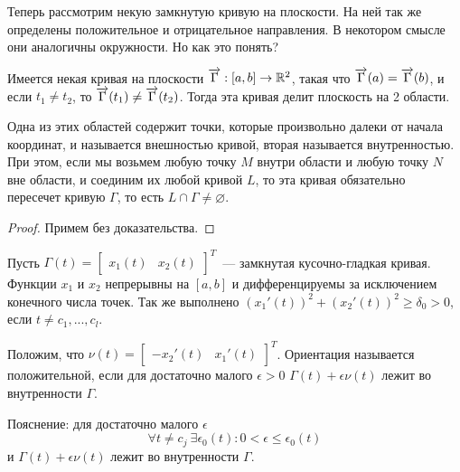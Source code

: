 \documentclass[main]{subfiles}
\begin{document}
Теперь рассмотрим некую замкнутую кривую на плоскости.
На ней так же определены положительное и отрицательное направления.
В некотором смысле они аналогичны окружности.
Но как это понять?

\begin{theorem}[Жордана]
    Имеется некая кривая на плоскости $\AnClOrCurve: [a, b] \to \R^2$, такая что $\AnClOrCurve(a) = \AnClOrCurve(b)$, и если $t_1 \neq t_2$, то $\AnClOrCurve(t_1) \neq \AnClOrCurve(t_2)$.
    Тогда эта кривая делит плоскость на 2 области.

    Одна из этих областей содержит точки, которые произвольно далеки от начала координат, и называется внешностью кривой, вторая называется внутренностью.
    При этом, если мы возьмем любую точку $M$ внутри области и любую точку $N$ вне области, и соединим их любой кривой $L$, то эта кривая обязательно пересечет кривую $\Gamma$, то есть $L \cap \Gamma \neq \varnothing$.
\end{theorem}
\begin{proof}
    Примем без доказательства.
\end{proof}

Пусть $\Gamma(t) =
    \begin{bmatrix}
        x_1(t) & x_2(t)
    \end{bmatrix}^T$~--- замкнутая кусочно-гладкая кривая.
Функции $x_1$ и $x_2$ непрерывны на $[a,b]$ и дифференцируемы за исключением конечного числа точек.
Так же выполнено $(x_1'(t))^2 + (x_2'(t))^2 \ge \delta_0 > 0$, если $t \neq c_1, ..., c_l$.

Положим, что $\nu(t) =
    \begin{bmatrix}
        -x_2'(t) & x_1'(t)
    \end{bmatrix}^T$.
Ориентация называется положительной, если для достаточно малого $\epsilon >0$ $\Gamma(t) + \epsilon \nu (t)$ лежит во внутренности $\Gamma$.

Пояснение: для достаточно малого $\epsilon$
\[\forall t \neq c_j\ \exists \epsilon_0(t): 0 < \epsilon \le \epsilon_0(t)\]
и $\Gamma(t) + \epsilon \nu (t)$ лежит во внутренности $\Gamma$.
\end{document}
